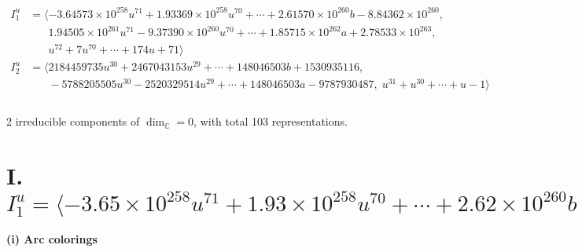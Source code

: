 \documentclass[1p]{elsarticle_modified}
\theoremstyle{definition}
\begin{document}
\begin{align*}
I^u_{1}&=\langle 
-3.64573\times10^{258} u^{71}+1.93369\times10^{258} u^{70}+\cdots+2.61570\times10^{260} b-8.84362\times10^{260},\\
\phantom{I^u_{1}}&\phantom{= \langle  }1.94505\times10^{261} u^{71}-9.37390\times10^{260} u^{70}+\cdots+1.85715\times10^{262} a+2.78533\times10^{263},\\
\phantom{I^u_{1}}&\phantom{= \langle  }u^{72}+7 u^{70}+\cdots+174 u+71\rangle \\
I^u_{2}&=\langle 
2184459735 u^{30}+2467043153 u^{29}+\cdots+148046503 b+1530935116,\\
\phantom{I^u_{2}}&\phantom{= \langle  }-5788205505 u^{30}-2520329514 u^{29}+\cdots+148046503 a-9787930487,\;u^{31}+u^{30}+\cdots+u-1\rangle \\
\\
\end{align*}
\raggedright * 2 irreducible components of $\dim_{\mathbb{C}}=0$, with total 103 representations.\\
\newpage
\renewcommand{\arraystretch}{1}
\centering \section*{I. $I^u_{1}= \langle -3.65\times10^{258} u^{71}+1.93\times10^{258} u^{70}+\cdots+2.62\times10^{260} b-8.84\times10^{260},\;1.95\times10^{261} u^{71}-9.37\times10^{260} u^{70}+\cdots+1.86\times10^{262} a+2.79\times10^{263},\;u^{72}+7 u^{70}+\cdots+174 u+71 \rangle$}
\flushleft \textbf{(i) Arc colorings}\\
\end{document}

